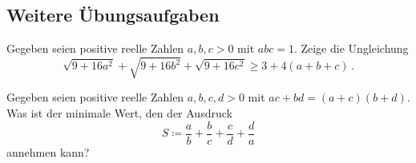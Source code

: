 \subsection*{Weitere Übungsaufgaben}
\begin{aufgabe*}
	Gegeben seien positive reelle Zahlen $a,b,c>0$ mit $abc=1$. Zeige die Ungleichung
	\begin{equation*}
		\sqrt{9+16a^2}+\sqrt{9+16b^2}+\sqrt{9+16c^2}\geqslant 3+4(a+b+c)\,.
	\end{equation*}
\end{aufgabe*}
\begin{aufgabe*}
	Gegeben seien positive reelle Zahlen $a,b,c,d>0$ mit $ac+bd=(a+c)(b+d)$. Was ist der minimale Wert, den der Ausdruck
	\begin{equation*}
		S\coloneqq\frac ab+\frac bc+\frac cd+\frac da
	\end{equation*}
	annehmen kann?
\end{aufgabe*}